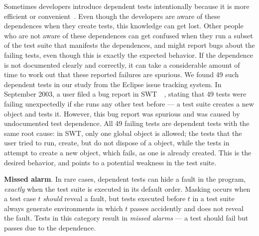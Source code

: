 Sometimes developers introduce dependent tests intentionally because it is
more efficient or convenient~\cite{kapfhammeretal:FSE:2003, whittakeretal:2012}.
Even though the developers are aware of these dependences
when they create tests, this knowledge can get lost.
Other people who are not aware of these dependences can get confused 
when they run a subset of the test suite that manifests the
dependences, and might report bugs about the failing tests,
even though this is exactly the expected behavior. 
If the dependence is not documented clearly and
correctly, it can take a considerable amount of time to work out that
these reported failures are spurious. We found
49 such dependent tests in our study from the Eclipse issue tracking system.
In September 2003, a user filed a
bug report in SWT~\cite{swt}~\cite{eclipsebug},
stating that 49 tests were failing unexpectedly
if she runs any other test before  --- 
a test suite creates a new  object and tests it.
However, this bug report was spurious and was
caused by undocumented test dependence.
All 49 failing tests are dependent tests with the same
root cause: in SWT, only one global 
object is allowed; the tests that the user tried to run,
create, but do not dispose of a  object, while
the tests in  attempt to create
a new  object, which fails, as one
is already created. This is the desired behavior,
and points to a potential weakness in the test suite.

\vspace{1mm}


\noindent \textbf{Missed alarm}. In rare cases,
dependent tests can hide a fault in the
program, \emph{exactly} when the test suite is executed in its default
order. Masking occurs when a test case $t$ \emph{should}
reveal a fault, but tests executed before $t$ in a test suite always
generate environments in which $t$ passes accidently and
does not reveal the fault. 
Tests in this category result in \textit{missed alarms} ---
a test should fail but passes due to the dependence.



